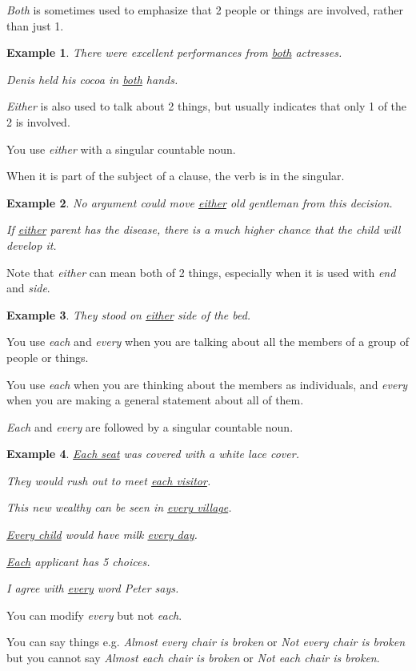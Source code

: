 \documentclass[oneside]{book}
\numberwithin{equation}{section}
\newtheorem{example}{Example}[section]
\begin{document}
\textit{Both} is sometimes used to emphasize that 2 people or things are involved, rather than just 1.
\begin{example}
    There were excellent performances from \underline{both} actresses.
    
    Denis held his cocoa in \underline{both} hands.
\end{example}
\textit{Either} is also used to talk about 2 things, but usually indicates that only 1 of the 2 is involved.

You use \textit{either} with a singular countable noun.

When it is part of the subject of a clause, the verb is in the singular.
\begin{example}
    No argument could move \underline{either} old gentleman from this decision.
    
    If \underline{either} parent has the disease, there is a much higher chance that the child will develop it.
\end{example}
Note that \textit{either} can mean both of 2 things, especially when it is used with \textit{end} and \textit{side}.
\begin{example}
    They stood on \underline{either} side of the bed.
\end{example}
%
\noindent{} You use \textit{each} and \textit{every} when you are talking about all the members of a group of people or things.

You use \textit{each} when you are thinking about the members as individuals, and \textit{every} when you are making a general statement about all of them.

\textit{Each} and \textit{every} are followed by a singular countable noun.
\begin{example}
    \underline{Each seat} was covered with a white lace cover.
    
    They would rush out to meet \underline{each visitor}.
    
    This new wealthy can be seen in \underline{every village}.
    
    \underline{Every child} would have milk \underline{every day}.
    
    \underline{Each} applicant has 5 choices.
    
    I agree with \underline{every} word Peter says.
\end{example}
You can modify \textit{every} but not \textit{each}.

You can say things e.g. \textit{Almost every chair is broken} or \textit{Not every chair is broken} but you cannot say \textit{Almost each chair is broken} or \textit{Not each chair is broken}.
\end{document}
